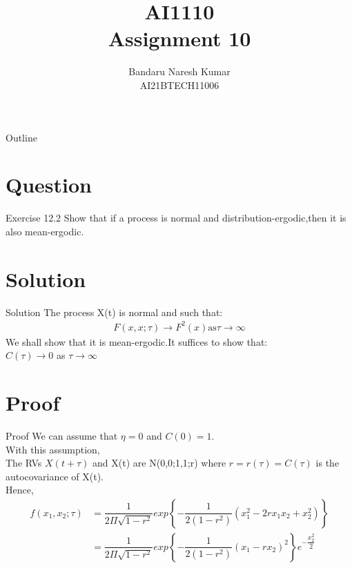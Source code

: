 \documentclass{beamer}
\title{AI1110 \\ Assignment 10}
\author{Bandaru Naresh Kumar \\ AI21BTECH11006}
\date{}
\begin{document}
	\begin{frame}
		\titlepage
	\end{frame}
	
	\begin{frame}{Outline}
    		\tableofcontents
	\end{frame}
	
	\section{Question}
	\begin{frame}{Exercise 12.2}
       Show that if a process is normal and distribution-ergodic,then it is also mean-ergodic.
	\end{frame}
	
	\section{Solution}
	\begin{frame}{Solution}
	    The process X(t) is normal and such that:\\
	    \begin{align}
	    F(x,x;\tau) \rightarrow F^2(x) \text{as} \tau\rightarrow\infty
	    \end{align}
	    We shall show that it is mean-ergodic.It suffices to show         that: \\
       $C(\tau)\rightarrow0$  as $\tau\rightarrow\infty$        	     
	 \end{frame}
	  
	 \section{Proof}
	 \begin{frame}{Proof}
	 We can assume that $\eta=0$ and $C(0)=1$.\\
	 With this assumption,\\
	    The RVs $X(t+\tau)$ and X(t) are N(0,0;1,1;r) where $r=r(\tau)=C(\tau)$ is the autocovariance of X(t).\\
	 Hence,\\
	 \begin{align}
	 f(x_1,x_2;\tau) &= \dfrac{1}{2\Pi\sqrt{1-r^2}}exp\left\lbrace-\dfrac{1}{2(1-r^2)}(x_1^2-2rx_1x_2+x_2^2) \right\rbrace\\ 
	                 &= \dfrac{1}{2\Pi\sqrt{1-r^2}}exp\left\lbrace-\dfrac{1}{2(1-r^2)}(x_1-rx_2)^2 \right\rbrace e^{-\dfrac{x_2^2}{2}}
     \end{align}	    
     \end{frame}	  
	 
\end{document}
